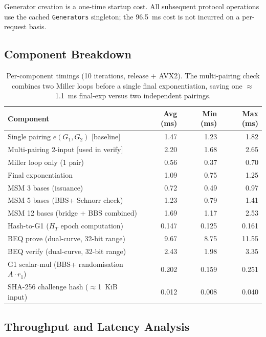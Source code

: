 \documentclass[11pt]{article}
\theoremstyle{definitionstyle}
\theoremstyle{plain}
\begin{document}
Generator creation is a one-time startup cost.  All subsequent protocol
operations use the cached \texttt{Generators} singleton; the 96.5~ms cost is
not incurred on a per-request basis.

\subsection{Component Breakdown}

\begin{table}[htbp]
\centering
\small
\begin{tabular}{|l|r|r|r|}
\hline
\textbf{Component} & \textbf{Avg (ms)} & \textbf{Min (ms)} & \textbf{Max (ms)} \\
\hline
Single pairing $e(G_1, G_2)$ [baseline]     & 1.47 & 1.23 & 1.82 \\
Multi-pairing 2-input [used in verify]       & 2.20 & 1.68 & 2.65 \\
\quad Miller loop only (1 pair)              & 0.56 & 0.37 & 0.70 \\
\quad Final exponentiation                   & 1.09 & 0.75 & 1.25 \\
\hline
MSM  3 bases (issuance)                      & 0.72 & 0.49 & 0.97 \\
MSM  5 bases (BBS+ Schnorr check)            & 1.23 & 0.79 & 1.41 \\
MSM 12 bases (bridge + BBS combined)         & 1.69 & 1.17 & 2.53 \\
\hline
Hash-to-G1 ($H_T$ epoch computation)         & 0.147 & 0.125 & 0.161 \\
BEQ prove (dual-curve, 32-bit range)         & 9.67 & 8.75 & 11.55 \\
BEQ verify (dual-curve, 32-bit range)        & 2.43 & 1.98 & 3.35 \\
G1 scalar-mul (BBS+ randomisation $A\cdot r_1$) & 0.202 & 0.159 & 0.251 \\
SHA-256 challenge hash ($\approx$1~KiB input)& 0.012 & 0.008 & 0.040 \\
\hline
\end{tabular}
\caption{Per-component timings (10 iterations, release + AVX2).  The
multi-pairing check combines two Miller loops before a single
final exponentiation, saving one $\approx$1.1~ms final-exp versus two
independent pairings.}
\label{tab:components}
\end{table}

\subsection{Throughput and Latency Analysis}
\end{document}
